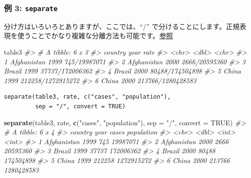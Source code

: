 \documentclass[
  xelatex, ja=standard]{bxjsbook}
\newenvironment{Shaded}{\begin{snugshade}}{\end{snugshade}}
\newcommand{\AttributeTok}[1]{\textcolor[rgb]{0.13,0.29,0.53}{#1}}
\newcommand{\CommentTok}[1]{\textcolor[rgb]{0.56,0.35,0.01}{\textit{#1}}}
\newcommand{\ConstantTok}[1]{\textcolor[rgb]{0.56,0.35,0.01}{#1}}
\newcommand{\FunctionTok}[1]{\textcolor[rgb]{0.13,0.29,0.53}{\textbf{#1}}}
\newcommand{\NormalTok}[1]{#1}
\newcommand{\StringTok}[1]{\textcolor[rgb]{0.31,0.60,0.02}{#1}}
\theoremstyle{definition}
\theoremstyle{definition}
\theoremstyle{definition}
\theoremstyle{definition}
\theoremstyle{remark}
\begin{document}
\hypertarget{ux4f8b-3-separate}{%
\subsubsection{\texorpdfstring{例 3: \texttt{separate}}{例 3: separate}}\label{ux4f8b-3-separate}}

分け方はいろいろとありますが、ここでは、``/'' で分けることにします。正規表現を使うことでかなり複雑な分離方法も可能です。\href{https://tidyr.tidyverse.org/reference/separate.html}{参照}

\begin{Shaded}
\begin{Highlighting}[]
\NormalTok{table3}
\CommentTok{\#\textgreater{} \# A tibble: 6 x 3}
\CommentTok{\#\textgreater{}   country      year rate             }
\CommentTok{\#\textgreater{}   \textless{}chr\textgreater{}       \textless{}dbl\textgreater{} \textless{}chr\textgreater{}            }
\CommentTok{\#\textgreater{} 1 Afghanistan  1999 745/19987071     }
\CommentTok{\#\textgreater{} 2 Afghanistan  2000 2666/20595360    }
\CommentTok{\#\textgreater{} 3 Brazil       1999 37737/172006362  }
\CommentTok{\#\textgreater{} 4 Brazil       2000 80488/174504898  }
\CommentTok{\#\textgreater{} 5 China        1999 212258/1272915272}
\CommentTok{\#\textgreater{} 6 China        2000 213766/1280428583}
\end{Highlighting}
\end{Shaded}

\begin{verbatim}
separate(table3, rate, c("cases", "population"), 
         sep = "/", convert = TRUE)
\end{verbatim}

\begin{Shaded}
\begin{Highlighting}[]
\FunctionTok{separate}\NormalTok{(table3, rate, }\FunctionTok{c}\NormalTok{(}\StringTok{"cases"}\NormalTok{, }\StringTok{"population"}\NormalTok{), }
         \AttributeTok{sep =} \StringTok{"/"}\NormalTok{, }\AttributeTok{convert =} \ConstantTok{TRUE}\NormalTok{)}
\CommentTok{\#\textgreater{} \# A tibble: 6 x 4}
\CommentTok{\#\textgreater{}   country      year  cases population}
\CommentTok{\#\textgreater{}   \textless{}chr\textgreater{}       \textless{}dbl\textgreater{}  \textless{}int\textgreater{}      \textless{}int\textgreater{}}
\CommentTok{\#\textgreater{} 1 Afghanistan  1999    745   19987071}
\CommentTok{\#\textgreater{} 2 Afghanistan  2000   2666   20595360}
\CommentTok{\#\textgreater{} 3 Brazil       1999  37737  172006362}
\CommentTok{\#\textgreater{} 4 Brazil       2000  80488  174504898}
\CommentTok{\#\textgreater{} 5 China        1999 212258 1272915272}
\CommentTok{\#\textgreater{} 6 China        2000 213766 1280428583}
\end{Highlighting}
\end{Shaded}
\end{document}
